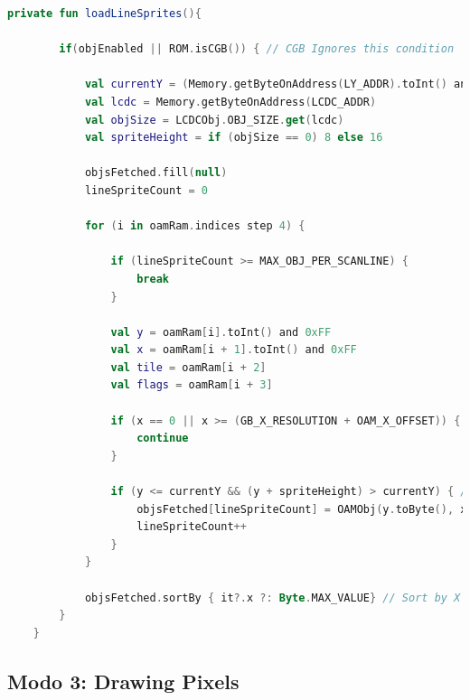 \begin{lstlisting}[language=Kotlin, caption={Obtención de sprites en modo OAM Scan.}, label={code:ppuoamscansprites}]
    private fun loadLineSprites(){

        if(objEnabled || ROM.isCGB()) { // CGB Ignores this condition

            val currentY = (Memory.getByteOnAddress(LY_ADDR).toInt() and 0xFF) + OAM_Y_OFFSET
            val lcdc = Memory.getByteOnAddress(LCDC_ADDR)
            val objSize = LCDCObj.OBJ_SIZE.get(lcdc)
            val spriteHeight = if (objSize == 0) 8 else 16

            objsFetched.fill(null)
            lineSpriteCount = 0

            for (i in oamRam.indices step 4) {

                if (lineSpriteCount >= MAX_OBJ_PER_SCANLINE) {
                    break
                }

                val y = oamRam[i].toInt() and 0xFF
                val x = oamRam[i + 1].toInt() and 0xFF
                val tile = oamRam[i + 2]
                val flags = oamRam[i + 3]

                if (x == 0 || x >= (GB_X_RESOLUTION + OAM_X_OFFSET)) { // Sprite not visible
                    continue
                }

                if (y <= currentY && (y + spriteHeight) > currentY) { // Sprite on current line
                    objsFetched[lineSpriteCount] = OAMObj(y.toByte(), x.toByte(), tile, flags)
                    lineSpriteCount++
                }
            }

            objsFetched.sortBy { it?.x ?: Byte.MAX_VALUE} // Sort by X position
        }
    }
\end{lstlisting}

\subsection{Modo 3: Drawing Pixels}

\cleardoublepage